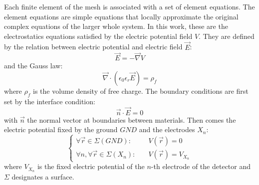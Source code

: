 
Each finite element of the mesh is associated with a set of element equations. The element equations are simple equations that locally approximate the original complex equations of the larger whole system. In this work, these are the electrostatics equations satisfied by the electric potential field $V$. They are defined by the relation between electric potential and electric field $\vec{E}$:
\begin{equation}
\label{eq:potential-definition}
\vec{E} = - \vec{\nabla} V
\end{equation}
and the Gauss law:
\begin{equation}
\label{eq:gauss-law}
\vec{\nabla} \cdot \left( \epsilon_0 \epsilon_r \vec{E} \right) = \rho_f
\end{equation}
where $\rho_f$ is the volume density of free charge. The boundary conditions are first set by the interface condition:
\begin{equation}
\vec{n} \cdot \vec{E} = 0
\end{equation}
with $\vec{n}$ the normal vector at boundaries between materials. Then comes the electric potential fixed by the ground $GND$ and the electrodes $X_n$:
\begin{equation}
\begin{cases}
\forall \vec{r} \in \Sigma (GND): & \quad V(\vec{r}) = 0 \\
\forall n, \forall \vec{r} \in \Sigma ( X_n ): & \quad V(\vec{r}) = V_{X_n}
\end{cases}
\end{equation}
where $V_{X_n}$ is the fixed electric potential of the $n$-th electrode of the detector and $\Sigma$ designates a surface.

